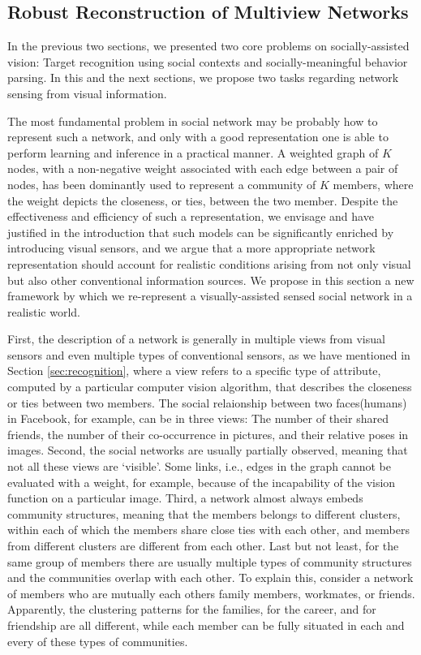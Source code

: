 \subsection{Robust Reconstruction of Multiview Networks}
\label{sec:reconstruct}

In the previous two sections, we presented two core problems on socially-assisted vision: Target recognition using social contexts and socially-meaningful behavior parsing. In this and the next sections, we propose two tasks regarding network sensing from visual information.

The most fundamental problem in social network may be probably how to represent such a network, and only with a good representation one is able to perform learning and inference in a practical manner. A weighted graph of $K$ nodes, with a non-negative weight associated with each edge between a pair of nodes, has been dominantly used to represent a community of $K$ members, where the weight depicts the closeness, or ties, between the two member. Despite the effectiveness and efficiency of such a representation, we envisage and have justified in the introduction that such models can be significantly enriched by introducing visual sensors, and we argue that a more appropriate network representation should account for realistic conditions arising from not only visual but also other conventional information sources. We propose in this section a new framework by which we re-represent a visually-assisted sensed social network in a realistic world.

First, the description of a network is generally in multiple views from visual sensors and even multiple types of conventional sensors, as we have mentioned in Section \ref{sec:recognition}, where a view refers to a specific type of attribute, computed by a particular computer vision algorithm, that describes the closeness or ties between two members. The social relaionship between two faces(humans) in Facebook, for example, can be in three views: The number of their shared friends, the number of their co-occurrence in pictures, and their relative poses in images. Second, the social networks are usually partially observed, meaning that not all these views are `visible'. Some links, i.e., edges in the graph cannot be evaluated with a weight, for example, because of the incapability of the vision function on a particular image. Third, a network almost always embeds community structures, meaning that the members belongs to different clusters, within each of which the members share close ties with each other, and members from different clusters are different from each other. Last but not least, for the same group of members there are usually multiple types of community structures and the communities overlap with each other. To explain this, consider a network of members who are mutually each others family members, workmates, or friends. Apparently, the clustering patterns for the families, for the career, and for friendship are all different, while each member can be fully situated in each and every of these types of communities.


